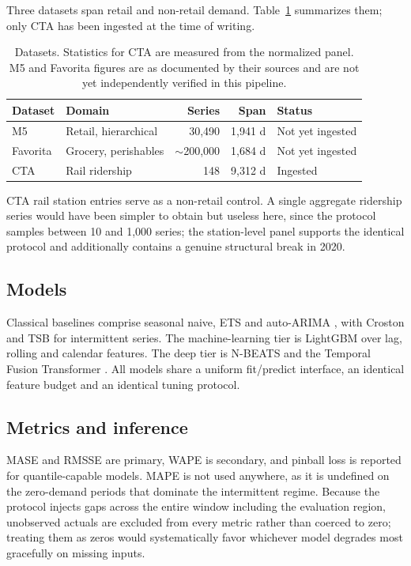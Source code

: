 \documentclass[11pt]{article}
\begin{document}
Three datasets span retail and non-retail demand. Table~\ref{tab:datasets}
summarizes them; only CTA has been ingested at the time of writing.

\begin{table}[t]
\centering
\caption{Datasets. Statistics for CTA are measured from the normalized panel.
M5 and Favorita figures are as documented by their sources and are not yet
independently verified in this pipeline.}
\label{tab:datasets}
\small
\begin{tabular}{llrrl}
\toprule
Dataset & Domain & Series & Span & Status \\
\midrule
M5 \citep{makridakis2022m5} & Retail, hierarchical & 30{,}490 & 1{,}941 d & Not yet ingested \\
Favorita & Grocery, perishables & $\sim$200{,}000 & 1{,}684 d & Not yet ingested \\
CTA & Rail ridership & 148 & 9{,}312 d & Ingested \\
\bottomrule
\end{tabular}
\end{table}

CTA rail station entries serve as a non-retail control. A single aggregate
ridership series would have been simpler to obtain but useless here, since the
protocol samples between 10 and 1{,}000 series; the station-level panel supports
the identical protocol and additionally contains a genuine structural break in
2020.

\subsection{Models}

Classical baselines comprise seasonal naive, ETS and auto-ARIMA
\citep{hyndman2008automatic}, with Croston \citep{croston1972} and TSB
\citep{teunter2011} for intermittent series. The machine-learning tier is
LightGBM \citep{ke2017lightgbm} over lag, rolling and calendar features. The deep
tier is N-BEATS \citep{oreshkin2020nbeats} and the Temporal Fusion Transformer
\citep{lim2021tft}. All models share a uniform fit/predict interface, an
identical feature budget and an identical tuning protocol.

\subsection{Metrics and inference}

MASE and RMSSE \citep{hyndman2006another} are primary, WAPE is secondary, and
pinball loss is reported for quantile-capable models. MAPE is not used anywhere,
as it is undefined on the zero-demand periods that dominate the intermittent
regime. Because the protocol injects gaps across the entire window including the
evaluation region, unobserved actuals are excluded from every metric rather than
coerced to zero; treating them as zeros would systematically favor whichever
model degrades most gracefully on missing inputs.
\end{document}

